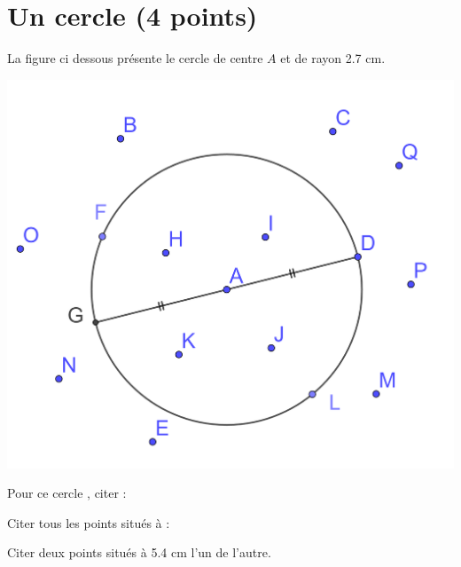\section{Un cercle (4 points)}

La figure ci dessous présente le cercle de centre $A$ et de rayon \num{2,7} cm.

\begin{center}
	\includegraphics[scale=0.15]{./img/cercle}
\end{center}

\begin{questions}
	\question Pour ce cercle , citer :
	

	\question Citer tous les points situés à :
	

	\question[1] Citer deux points situés à \num{5.4} cm l'un de l'autre.
\end{questions}